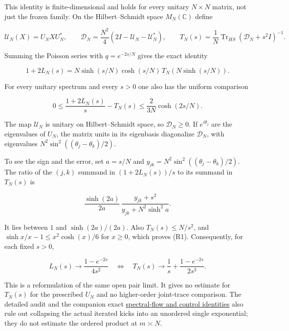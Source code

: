 \begin{theorem}\label{pass2:frontier-res-006}

This identity is finite-dimensional and holds
for every unitary \(N\times N\) matrix, not just the frozen family. On the
Hilbert--Schmidt space \(M_N(\mathbb C)\) define

\[
\mathcal U_N(X)=U_N XU_N^*,\qquad
\mathcal D_N=\frac{N^2}{4}\left(2I-\mathcal U_N-\mathcal U_N^*\right),\qquad
T_N(s)=\frac1N\operatorname{Tr}_{HS}(\mathcal D_N+s^2I)^{-1}.
\]

Summing the Poisson series with
\(q=e^{-2s/N}\) gives the exact identity

\[
1+2L_N(s)=N\sinh(s/N)\cosh(s/N)\,T_N\!\left(N\sinh(s/N)\right).
\]

For every unitary spectrum and every \(s>0\) one also has the uniform comparison

\[
0\le \frac{1+2L_N(s)}{s}-T_N(s)
\le \frac{2}{3N}\cosh(2s/N).                         \tag{R1}
\]

\end{theorem}

The map \(\mathcal U_N\) is unitary on Hilbert--Schmidt space, so
\(\mathcal D_N\ge0\). If \(e^{i\theta_j}\) are the eigenvalues of \(U_N\), the
matrix units in its eigenbasis diagonalize \(\mathcal D_N\), with eigenvalues
\(N^2\sin^2((\theta_j-\theta_k)/2)\).

To see the sign and the error, set \(a=s/N\) and
\(y_{jk}=N^2\sin^2((\theta_j-\theta_k)/2)\). The ratio of the \((j,k)\) summand
in \((1+2L_N(s))/s\) to its summand in \(T_N(s)\) is

\[
\frac{\sinh(2a)}{2a}\,\frac{y_{jk}+s^2}{y_{jk}+N^2\sinh^2a}.
\]

It lies between \(1\) and \(\sinh(2a)/(2a)\). Also
\(T_N(s)\le N/s^2\), and
\(\sinh x/x-1\le x^2\cosh(x)/6\) for \(x\ge0\), which proves (R1).
Consequently, for each fixed \(s>0\),

\[
L_N(s)\longrightarrow\frac{1-e^{-2s}}{4s^2}
\quad\Longleftrightarrow\quad
T_N(s)\longrightarrow\frac1s+\frac{1-e^{-2s}}{2s^3}.
\]

This is a reformulation of the same open pair limit. It gives no estimate
for \(T_N(s)\) for the prescribed \(U_N\) and no higher-order joint-trace
comparison. The detailed audit and the companion exact
\href{https://github.com/ChurilovMaksim/BGS/blob/main/mathematics/frozen_spectral_flow_controls.md}{spectral-flow and control identities}
also rule out collapsing the actual iterated kicks into an unordered single
exponential; they do not estimate the ordered product at \(m\asymp N\).

